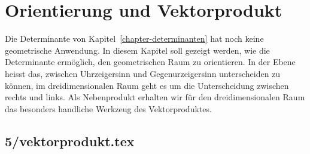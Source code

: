 %
%
%
\chapter{Orientierung und Vektorprodukt\label{chapter:orientierung}}
Die Determinante von Kapitel~\ref{chapter-determinanten} hat noch
keine geometrische Anwendung.
In diesem Kapitel soll gezeigt werden, wie die Determinante ermöglich,
den geometrischen Raum zu orientieren.
In der Ebene heisst das, zwischen Uhrzeigersinn und Gegenurzeigersinn
unterscheiden zu können, im dreidimensionalen Raum geht es um die
Unterscheidung zwischen rechts und links.
Als Nebenprodukt erhalten wir für den dreidimensionalen Raum das
besonders handliche Werkzeug des Vektorproduktes.



\section{5/vektorprodukt.tex}
